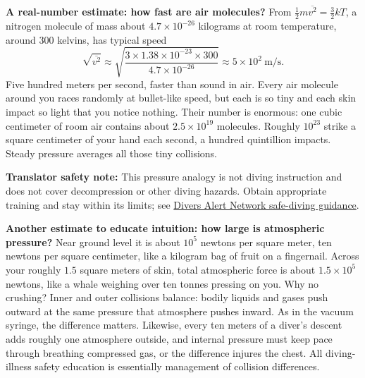 \textbf{A real-number estimate: how fast are air molecules?} From \(\frac{1}{2}m\overline{v^2}=\frac{3}{2}kT\), a nitrogen molecule of mass about \(4.7\times10^{-26}\) kilograms at room temperature, around 300 kelvins, has typical speed
\[
\sqrt{\overline{v^2}} \approx \sqrt{\frac{3\times 1.38\times 10^{-23}\times 300}{4.7\times 10^{-26}}} \approx 5\times 10^{2}\ \text{m/s}.
\]
Five hundred meters per second, faster than sound in air. Every air molecule around you races randomly at bullet-like speed, but each is so tiny and each skin impact so light that you notice nothing. Their number is enormous: one cubic centimeter of room air contains about \(2.5\times10^{19}\) molecules. Roughly \(10^{23}\) strike a square centimeter of your hand each second, a hundred quintillion impacts. Steady pressure averages all those tiny collisions.

\textbf{Translator safety note:} This pressure analogy is not diving instruction and does not cover decompression or other diving hazards. Obtain appropriate training and stay within its limits; see \href{https://world.dan.org/safety-prevention/diver-safety/safe-diving-practices/}{Divers Alert Network safe-diving guidance}.

\textbf{Another estimate to educate intuition: how large is atmospheric pressure?} Near ground level it is about \(10^5\) newtons per square meter, ten newtons per square centimeter, like a kilogram bag of fruit on a fingernail. Across your roughly \(1.5\) square meters of skin, total atmospheric force is about \(1.5\times10^5\) newtons, like a whale weighing over ten tonnes pressing on you. Why no crushing? Inner and outer collisions balance: bodily liquids and gases push outward at the same pressure that atmosphere pushes inward. As in the vacuum syringe, the difference matters. Likewise, every ten meters of a diver's descent adds roughly one atmosphere outside, and internal pressure must keep pace through breathing compressed gas, or the difference injures the chest. All diving-illness safety education is essentially management of collision differences.

\begin{center}
\end{center}

